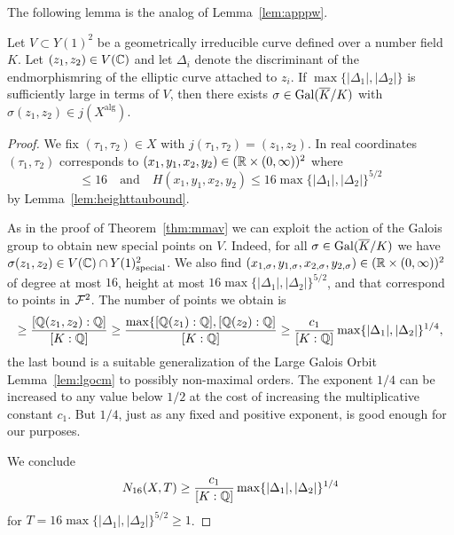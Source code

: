 The following lemma is the analog of Lemma~\ref{lem:apppw}. 
\begin{lemma}
  \label{lem:apppwao}
  Let $V\subset Y(1)^2$ be a geometrically irreducible curve defined
  over a number field $K$.
  Let $(z_1,z_2)\in V({\mathbb{C}})$ and let $\Delta_i$ denote the discriminant
  of the endmorphismring of the elliptic curve attached to $z_i$.
  If $\max\{|\Delta_1|,|\Delta_2|\}$ is sufficiently large in terms of
  $V$, then there exists $\sigma\in \mathrm{Gal}(\overline{K}/K)$ with
  $\sigma(z_1,z_2)\in j(X^{\mathrm{alg}})$.   
\end{lemma}
\begin{proof}%
  We fix $(\tau_1,\tau_2) \in X$ with $j(\tau_1,\tau_2)=(z_1,z_2)$.
  In real coordinates $(\tau_1,\tau_2)$ corresponds to
  $(x_1,y_1,x_2,y_2) \in ({\mathbb{R}}\times(0,\infty))^2$ where
  \begin{equation*}
    [\IQ(x_1,y_1,x_2,y_1):\IQ]\le 16
    \quad\text{and}\quad
    H(x_1,y_1,x_2,y_2) \le 16 \max\{|\Delta_1|,|\Delta_2|\}^{5/2}
  \end{equation*}
  by Lemma~\ref{lem:heighttaubound}.

  As in the proof of Theorem~\ref{thm:mmav} we can exploit the action of the
  Galois group to obtain new special points on $V$. Indeed, for all
  $\sigma\in \mathrm{Gal}(\overline{K}/K)$ we have $\sigma(z_1,z_2) \in
  V({\mathbb{C}})\cap Y(1)^2_{\mathrm{special}}$. We also find
  $(x_{1,\sigma},y_{1,\sigma},x_{2,\sigma},y_{2,\sigma})\in({\mathbb{R}}\times(0,\infty))^2$
  of degree at most $16$, height at most
  $16\max\{|\Delta_1|,|\Delta_2|\}^{5/2}$, and   
  that correspond to points in ${\mathcal F}^2$.
  The number of points we obtain is
  \begin{equation*}
    [K(z_1,z_2):K] \ge \frac{[\IQ(z_1,z_2):\IQ]}{[K:\IQ]} \ge
    \frac{\max\{[\IQ(z_1):\IQ],[\IQ(z_2):\IQ]}{[K:\IQ]}
    \ge \frac{c_1}{[K:\IQ]}  \max\{|\Delta_1|,|\Delta_2|\}^{1/4},
  \end{equation*}
  the last bound is a suitable generalization of the Large Galois
  Orbit Lemma~\ref{lem:lgocm}
  to possibly non-maximal orders. The exponent $1/4$ can be increased
  to any value below $1/2$ at the cost of increasing the
  multiplicative constant $c_1$. But $1/4$, just as any fixed and
  positive exponent, is good enough for our purposes.


  We conclude
  \begin{equation}
    \label{eq:aonlb}
    N_{16}(X,T) \ge \frac{c_1}{[K:{\mathbb{Q}}]} \max\{|\Delta_1|,|\Delta_2|\}^{1/4}
  \end{equation}
  for $T = 16 \max\{|\Delta_1|,|\Delta_2|\}^{5/2}\ge 1$. 


\end{proof}
